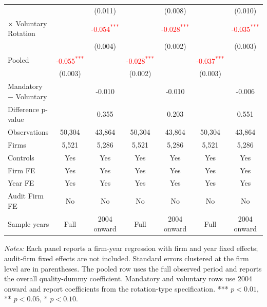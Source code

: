\documentclass[10pt]{article}
\newcommand{\sym}[1]{\textsuperscript{#1}}
\begin{document}
\begin{minipage}{19cm}
\begin{threeparttable}
\begin{tabular}{l cc cc cc}
 &  & (0.011) &  & (0.008) &  & (0.010) \\
$\times$ Voluntary Rotation &  & \textcolor{red}{-0.054\sym{***}} &  & \textcolor{red}{-0.028\sym{***}} &  & \textcolor{red}{-0.035\sym{***}} \\
 &  & (0.004) &  & (0.002) &  & (0.003) \\
Pooled & \textcolor{red}{-0.055\sym{***}} &  & \textcolor{red}{-0.028\sym{***}} &  & \textcolor{red}{-0.037\sym{***}} &  \\
 & (0.003) &  & (0.002) &  & (0.003) &  \\
Mandatory $-$ Voluntary &  & -0.010 &  & -0.010 &  & -0.006 \\
Difference p-value &  & 0.355 &  & 0.203 &  & 0.551 \\
Observations & 50,304 & 43,864 & 50,304 & 43,864 & 50,304 & 43,864 \\
Firms & 5,521 & 5,286 & 5,521 & 5,286 & 5,521 & 5,286 \\
\midrule
Controls & Yes & Yes & Yes & Yes & Yes & Yes \\
Firm FE & Yes & Yes & Yes & Yes & Yes & Yes \\
Year FE & Yes & Yes & Yes & Yes & Yes & Yes \\
Audit Firm FE & No & No & No & No & No & No \\
Sample years & Full & 2004 onward & Full & 2004 onward & Full & 2004 onward \\
\bottomrule
\end{tabular}
\begin{tablenotes}\fontsize{9}{11}\selectfont
\item \fontsize{9}{11}\selectfont \textit{Notes:} Each panel reports a firm-year regression with firm and year fixed effects; audit-firm fixed effects are not included. Standard errors clustered at the firm level are in parentheses. The pooled row uses the full observed period and reports the overall quality-dummy coefficient. Mandatory and voluntary rows use 2004 onward and report coefficients from the rotation-type specification. *** \(p<0.01\), ** \(p<0.05\), * \(p<0.10\).
\end{tablenotes}
\end{threeparttable}

\end{minipage}
\end{document}
